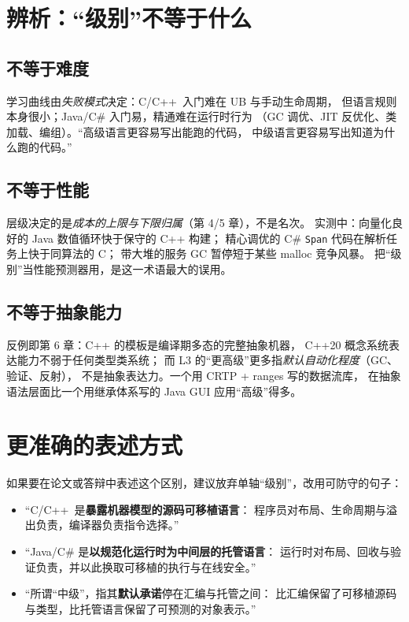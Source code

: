\documentclass[12pt,a4paper,fontset=fandol]{ctexbook}
\newcommand{\Cplus}[1]{C++\,#1}
\begin{document}
\section{辨析：``级别''不等于什么}

\subsection*{不等于难度}

学习曲线由\emph{失败模式}决定：C/\allowbreak{}\Cplus{} 入门难在 UB 与手动生命周期，
但语言规则本身很小；Java/C\# 入门易，精通难在运行时行为
（GC 调优、JIT 反优化、类加载、编组）。``高级语言更容易写出能跑的代码，
中级语言更容易写出知道为什么跑的代码。''

\subsection*{不等于性能}

层级决定的是\emph{成本的上限与下限归属}（第 4/5 章），不是名次。
实测中：向量化良好的 Java 数值循环快于保守的 C++ 构建；
精心调优的 C\# \texttt{Span} 代码在解析任务上快于同算法的 C；
带大堆的服务 GC 暂停短于某些 malloc 竞争风暴。
把``级别''当性能预测器用，是这一术语最大的误用。

\subsection*{不等于抽象能力}

反例即第 6 章：C++ 的模板是编译期多态的完整抽象机器，
C++20 概念系统表达能力不弱于任何类型类系统；
而 L3 的``更高级''更多指\emph{默认自动化程度}（GC、验证、反射），
不是抽象表达力。一个用 CRTP + ranges 写的数据流库，
在抽象语法层面比一个用继承体系写的 Java GUI 应用``高级''得多。

\section{更准确的表述方式}

如果要在论文或答辩中表述这个区别，建议放弃单轴``级别''，改用可防守的句子：

\begin{itemize}
  \item ``C/\allowbreak{}\Cplus{} 是\textbf{暴露机器模型的源码可移植语言}：
        程序员对布局、生命周期与溢出负责，编译器负责指令选择。''
  \item ``Java/C\# 是\textbf{以规范化运行时为中间层的托管语言}：
        运行时对布局、回收与验证负责，并以此换取可移植的执行与在线安全。''
  \item ``所谓``中级''，指其\textbf{默认承诺}停在汇编与托管之间：
        比汇编保留了可移植源码与类型，比托管语言保留了可预测的对象表示。''
\end{itemize}
\end{document}
